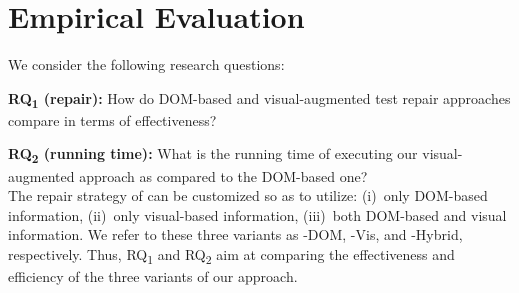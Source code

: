 
\section{Empirical Evaluation}\label{sec:evaluation}

We consider the following research questions:

\noindent

\noindent
\textbf{RQ\textsubscript{1} (repair):} How do DOM-based and visual-augmented test repair approaches compare in terms of effectiveness?

\noindent
\textbf{RQ\textsubscript{2} (running time):} What is the running time of executing our visual-augmented approach as compared to the DOM-based one? \\

%

\noindent
The repair strategy of \tool can be customized so as to utilize: (i)~only DOM-based information, (ii)~only visual-based information,  (iii)~both DOM-based and visual information. We refer to these three variants as \tool-DOM, \tool-Vis, and \tool-Hybrid, respectively.
Thus, RQ\textsubscript{1} and RQ\textsubscript{2} aim at comparing the effectiveness and efficiency of the three variants of our approach.

